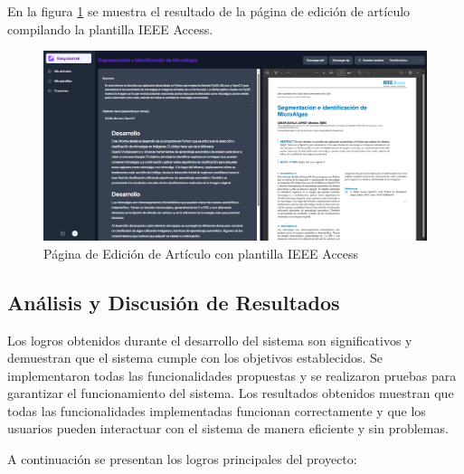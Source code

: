 En la figura \ref{fig:captura-13} se muestra el resultado de la página de edición de artículo compilando la plantilla IEEE Access.

\begin{figure}[H]
    \centering
    \includegraphics[width=1\textwidth]{IMAGENES/captura-13.png}
    \caption{Página de Edición de Artículo con plantilla IEEE Access}
    \label{fig:captura-13}
\end{figure}

\subsection{Análisis y Discusión de Resultados}
Los logros obtenidos durante el desarrollo del sistema son significativos y demuestran que el sistema cumple con los objetivos establecidos. Se implementaron todas las funcionalidades propuestas y se realizaron pruebas para garantizar el funcionamiento del sistema. Los resultados obtenidos muestran que todas las funcionalidades implementadas funcionan correctamente y que los usuarios pueden interactuar con el sistema de manera eficiente y sin problemas.

A continuación se presentan los logros principales del proyecto:

